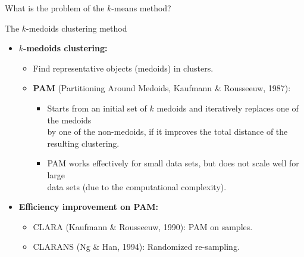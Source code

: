 \documentclass[aspectratio=169,t,xcolor=dvipsnames]{beamer}
\begin{document}
{\begin{frame}{What is the problem of the $k$-means method?}
    \end{frame}
  }

  {
    \begin{frame}{The $k$-medoids clustering method}
      \begin{itemize}
        \item \textbf{$k$-medoids clustering:}
        \begin{itemize}
          \item Find representative objects (medoids) in clusters.
          \item \textbf{PAM} (Partitioning Around Medoids, Kaufmann \& Rousseeuw, 1987):
            \begin{itemize}
              \item Starts from an initial set of $k$ medoids and iteratively replaces one of the medoids \\
              by one of the non-medoids, if it improves the total distance of the resulting clustering.
              \item PAM works effectively for small data sets, but does not scale well for large\\
              data sets (due to the computational complexity).
            \end{itemize}
            \end{itemize}
        \item \textbf{Efficiency improvement on PAM:}
        \begin{itemize}
          \item CLARA (Kaufmann \& Rousseeuw, 1990): PAM on samples.
          \item CLARANS (Ng \& Han, 1994): Randomized re-sampling.
        \end{itemize}
      \end{itemize}
    \end{frame}
  }
\end{document}
